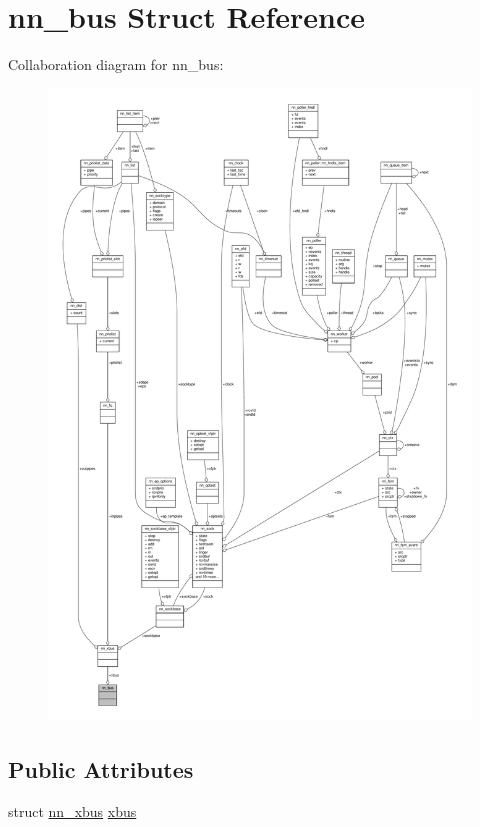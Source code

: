 \hypertarget{structnn__bus}{}\section{nn\+\_\+bus Struct Reference}
\label{structnn__bus}


Collaboration diagram for nn\+\_\+bus\+:\nopagebreak
\begin{figure}[H]
\begin{center}
\leavevmode
\includegraphics[width=350pt]{structnn__bus__coll__graph}
\end{center}
\end{figure}
\subsection*{Public Attributes}
\begin{DoxyCompactItemize}
\item 
struct \hyperlink{structnn__xbus}{nn\+\_\+xbus} \hyperlink{structnn__bus_a4e1cacf22f06d92e9707e3ca357072fe}{xbus}
\end{DoxyCompactItemize}


